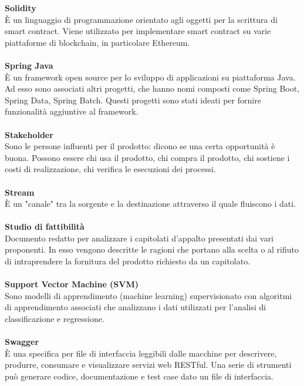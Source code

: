 \textbf{Solidity}\\
È un linguaggio di programmazione orientato agli oggetti per la scrittura di smart contract. Viene utilizzato per implementare smart contract su varie piattaforme di blockchain, in particolare Ethereum. \\ \\
\textbf{Spring Java}\\ 
È un framework open source per lo sviluppo di applicazioni su piattaforma Java. Ad esso sono associati altri progetti, che hanno nomi composti come Spring Boot, Spring Data, 
Spring Batch. Questi progetti sono stati ideati per fornire funzionalità aggiuntive al framework.\\ \\
\textbf{Stakeholder}\\
Sono le persone influenti per il prodotto: dicono se una certa opportunità è buona. Possono essere chi usa il prodotto, chi compra il prodotto, chi sostiene i costi di realizzazione, chi verifica le esecuzioni dei processi. \\ \\
\textbf{Stream}\\
È un "canale" tra la sorgente e la destinazione attraverso il quale fluiscono i dati. \\ \\
\textbf{Studio di fattibilità}\\
Documento redatto per analizzare i capitolati d'appalto presentati dai vari proponenti.
In esso vengono descritte le ragioni che portano alla scelta o al rifiuto di intraprendere la fornitura del prodotto richiesto da un capitolato. \\ \\
\textbf{Support Vector Machine (SVM)}\\
Sono modelli di apprendimento (machine learning) supervisionato con algoritmi di apprendimento associati che analizzano i dati utilizzati per l'analisi di classificazione e regressione. \\ \\
\textbf{Swagger}\\ 
È una specifica per file di interfaccia leggibili dalle macchine per descrivere, produrre, consumare e visualizzare servizi web RESTful. Una serie di strumenti può generare codice, 
documentazione e test case dato un file di interfaccia.\\ \\

\clearpage